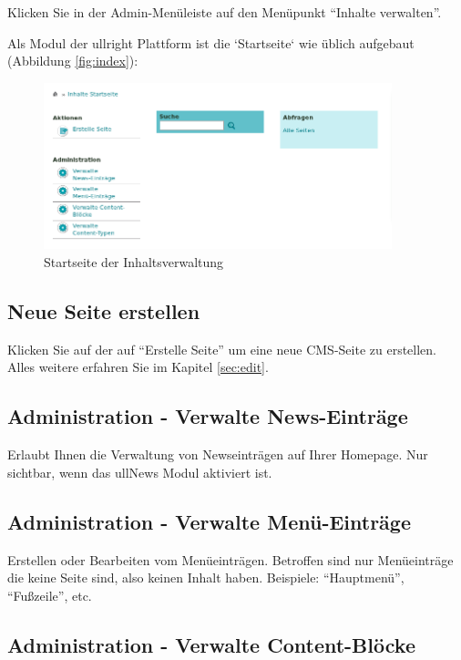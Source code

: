 \documentclass[article, a4paper, oneside, 11pt]{memoir}
\begin{document}
Klicken Sie in der Admin-Menüleiste auf den Menüpunkt "`Inhalte verwalten"'. 

Als Modul der ullright Plattform ist die `Startseite` wie üblich aufgebaut (Abbildung \vref{fig:index}):

\begin{figure}[htp]
\centering
\includegraphics[width=0.9\textwidth]{index}
\caption{Startseite der Inhaltsverwaltung}
\label{fig:index}
\end{figure}

\subsection{Neue Seite erstellen}

Klicken Sie auf der auf "`Erstelle Seite"' um eine neue CMS-Seite zu erstellen. Alles weitere erfahren Sie im Kapitel \vref{sec:edit}.

\subsection{Administration - Verwalte News-Einträge}

Erlaubt Ihnen die Verwaltung von Newseinträgen auf Ihrer Homepage. Nur sichtbar, wenn das ullNews Modul aktiviert ist.

\subsection{Administration - Verwalte Menü-Einträge}

Erstellen oder Bearbeiten vom Menüeinträgen. Betroffen sind nur Menüeinträge die keine Seite sind, also keinen Inhalt haben.
Beispiele: "`Hauptmenü"', "`Fußzeile"', etc.

\subsection{Administration - Verwalte Content-Blöcke}
\end{document}
